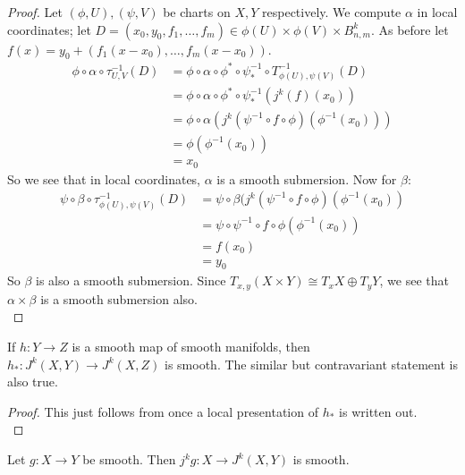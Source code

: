 \documentclass[12pt]{article}
\begin{document}
\begin{proof}
    Let $(\phi, U), (\psi, V)$ be charts on $X, Y$ respectively. We compute $\alpha$ in local coordinates; let $D = (x_0, y_0, f_1, \dots, f_m)\in \phi(U) \times \phi(V) \times B_{n, m}^k$. As before let $f(x) = y_0 + (f_1(x-x_0), \dots, f_m(x-x_0))$. 
    \begin{align*}
        \phi \circ \alpha \circ \tau_{U, V}^{-1} (D) & = \phi\circ \alpha \circ \phi^* \circ \psi_*^{-1} \circ T_{\phi(U), \psi(V)}^{-1} (D) \\ 
        & = \phi\circ \alpha \circ \phi^* \circ \psi_*^{-1} (j^k(f)(x_0)) \\ 
        & = \phi \circ \alpha (j^k(\psi^{-1} \circ f \circ \phi)(\phi^{-1}(x_0))) \\ 
        & = \phi(\phi^{-1}(x_0)) \\ 
        & = x_0
    \end{align*}
    So we see that in local coordinates, $\alpha$ is a smooth submersion. Now for $\beta$: 
    \begin{align*}
        \psi \circ \beta \circ \tau_{\phi(U), \psi(V)}^{-1} (D) & = \psi \circ \beta (j^k(\psi^{-1} \circ f \circ \phi) (\phi^{-1}(x_0)) \\ 
        & = \psi \circ \psi^{-1} \circ f \circ \phi(\phi^{-1}(x_0)) \\ 
        & = f(x_0) \\ 
        & = y_0
    \end{align*}
    So $\beta$ is also a smooth submersion. Since $T_{x, y} (X\times Y) \cong T_x X \oplus T_y Y$, we see that $\alpha \times \beta$ is a smooth submersion also. \\
\end{proof}

\begin{proposition}
    If $h: Y \to Z$ is a smooth map of smooth manifolds, then $h_*: J^k(X, Y) \to J^k(X, Z)$ is smooth. The similar but contravariant statement is also true. 
\end{proposition}

\begin{proof}
    This just follows from  once a local presentation of $h_*$ is written out. \\
\end{proof}

\begin{proposition} \label{smooth prolongation}
    Let $g: X \to Y$ be smooth. Then $j^k g: X \to J^k(X, Y)$ is smooth. 
\end{proposition}
\end{document}
